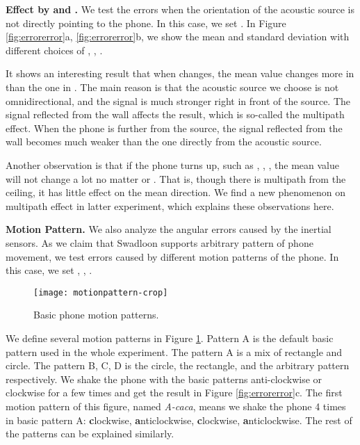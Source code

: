 \documentclass[]{sig-alternate-10pt}
\def \ourprotocol{Swadloon\xspace}
\begin{document}
\noindent\textbf{Effect by  and .}
We test the errors when the orientation of the acoustic source is not
directly pointing to the phone. In this case, we set
. In Figure \ref{fig:errorerror}a, \ref{fig:errorerror}b, we show
the mean and standard deviation with different choices of
, , .

It shows an interesting result that when 
 changes, the mean value changes more in  than the one
 in . The main reason is that the acoustic source we
 choose is not omnidirectional, and the signal is much stronger right
 in front of the source.
The signal reflected from the wall affects the result, which is
 so-called the multipath effect.
When the phone is further from the source, the signal reflected
 from the wall becomes much weaker than the one directly from the acoustic source.

Another observation is that if the phone turns up, such as
 , , , the mean value will not
 change a lot no matter  or . That is, though there is
 multipath from the ceiling, it has little effect on the mean
 direction.
We find a new phenomenon on multipath effect in latter
experiment, which  explains these observations here.


\noindent\textbf{Motion Pattern.} We also analyze the angular errors
caused by the inertial sensors.
As we claim that \ourprotocol supports arbitrary pattern of phone
movement, we test errors caused by different motion patterns of the
phone. In this case, we set , ,
.

\begin{figure}[h]
\begin{centering}
        \texttt{[image: motionpattern-crop]}
\par\end{centering}
\caption{Basic phone motion patterns.}
    \label{fig:motionpattern}
\end{figure}

We define several motion patterns in Figure \ref{fig:motionpattern}.
Pattern A is the default basic pattern used in the whole experiment.
The pattern A is a mix of rectangle and circle. The pattern
B, C, D is the circle, the rectangle, and the arbitrary
pattern respectively. We shake the phone with the basic patterns
anti-clockwise or 
clockwise for a few times and get the result in Figure
\ref{fig:errorerror}c. The first motion pattern of this figure,
named \emph{A-caca}, means we shake the phone 4 times in basic pattern
A: \textbf{c}lockwise, \textbf{a}nticlockwise, \textbf{c}lockwise,
\textbf{a}nticlockwise. The rest of the patterns can be explained
similarly.
\end{document}
